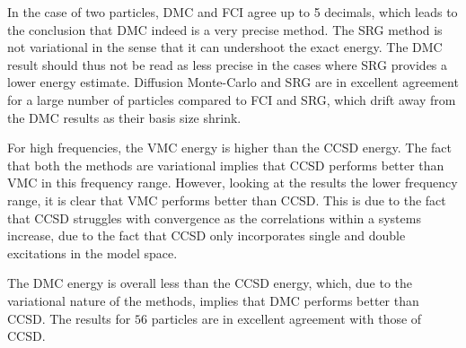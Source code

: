 In the case of two particles, DMC and FCI agree up to 5 decimals, which leads to the conclusion that DMC indeed is a very precise method. The SRG method is not variational in the sense that it can undershoot the exact energy. The DMC result should thus not be read as less precise in the cases where SRG provides a lower energy estimate. Diffusion Monte-Carlo and SRG are in excellent agreement for a large number of particles compared to FCI and SRG, which drift away from the DMC results as their basis size shrink. 


For high frequencies, the VMC energy is higher than the CCSD energy. The fact that both the methods are variational implies that CCSD performs better than VMC in this frequency range. However, looking at the results the lower frequency range, it is clear that VMC performs better than CCSD. This is due to the fact that CCSD struggles with convergence as the correlations within a systems increase, due to the fact that CCSD only incorporates single and double excitations in the model space. 

The DMC energy is overall less than the CCSD energy, which, due to the variational nature of the methods, implies that DMC performs better than CCSD. The results for $56$ particles are in excellent agreement with those of CCSD. 




